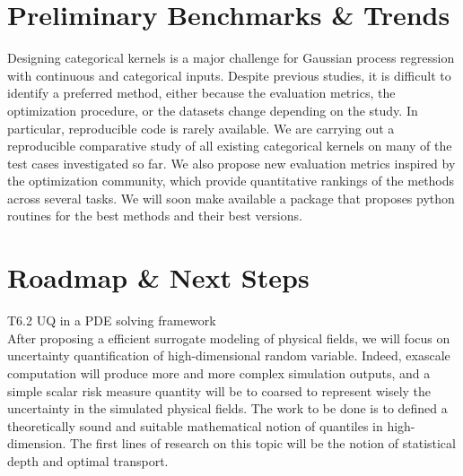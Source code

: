 \section{Preliminary Benchmarks \& Trends}


Designing categorical kernels is a major challenge for Gaussian process regression with continuous and categorical inputs. Despite previous studies, it is difficult to identify a preferred method, either because the evaluation metrics,
the optimization procedure, or the datasets change depending on the study. In particular, reproducible code is rarely available. We are carrying out a reproducible comparative study of all existing categorical kernels
on many of the test cases investigated so far. We also propose new evaluation metrics inspired by the optimization
community, which provide quantitative rankings of the methods across several tasks. 
We will soon make available a package that proposes python routines for the best methods and their best versions.



\section{Roadmap \& Next Steps}

T6.2 UQ in a PDE solving framework \\ 
After proposing a efficient surrogate modeling of physical fields, we will focus on uncertainty quantification of high-dimensional random variable. Indeed, exascale computation will produce more and more complex simulation outputs, and a simple scalar risk measure quantity will be to coarsed to represent wisely the uncertainty in the simulated physical fields. The work to be done is to defined a theoretically sound and suitable mathematical notion of quantiles in high-dimension. The first lines of research on this topic will be the notion of statistical depth and optimal transport. 

